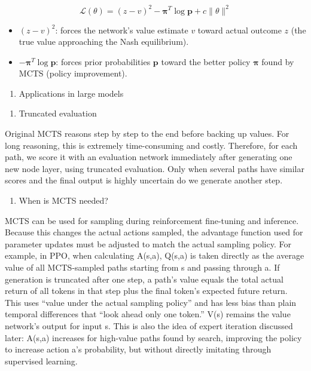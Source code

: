 \[
\mathcal{L}(\theta)=(z-v)^2-\boldsymbol{\pi}^{T}\log\mathbf{p}+c\lVert\theta\rVert^2
\]

\begin{itemize}
\tightlist
\item
  \((z-v)^2\): forces the network's value estimate \(v\) toward actual outcome \(z\) (the true value approaching the Nash equilibrium).
\item
  \(-\boldsymbol{\pi}^{T}\log\mathbf{p}\): forces prior probabilities \(\mathbf{p}\) toward the better policy \(\boldsymbol{\pi}\) found by MCTS (policy improvement).
\end{itemize}

\begin{enumerate}
\def\labelenumi{\arabic{enumi}.}
\setcounter{enumi}{2}
\tightlist
\item
  Applications in large models
\end{enumerate}

\begin{enumerate}
\def\labelenumi{(\arabic{enumi})}
\tightlist
\item
  Truncated evaluation
\end{enumerate}

Original MCTS reasons step by step to the end before backing up values. For long reasoning, this is extremely time-consuming and costly. Therefore, for each path, we score it with an evaluation network immediately after generating one new node layer, using truncated evaluation. Only when several paths have similar scores and the final output is highly uncertain do we generate another step.

\begin{enumerate}
\def\labelenumi{(\arabic{enumi})}
\setcounter{enumi}{1}
\tightlist
\item
  When is MCTS needed?
\end{enumerate}

MCTS can be used for sampling during reinforcement fine-tuning and inference. Because this changes the actual actions sampled, the advantage function used for parameter updates must be adjusted to match the actual sampling policy. For example, in PPO, when calculating A(s,a), Q(s,a) is taken directly as the average value of all MCTS-sampled paths starting from s and passing through a. If generation is truncated after one step, a path's value equals the total actual return of all tokens in that step plus the final token's expected future return. This uses ``value under the actual sampling policy'' and has less bias than plain temporal differences that ``look ahead only one token.'' V(s) remains the value network's output for input s. This is also the idea of expert iteration discussed later: A(s,a) increases for high-value paths found by search, improving the policy to increase action a's probability, but without directly imitating through supervised learning.

